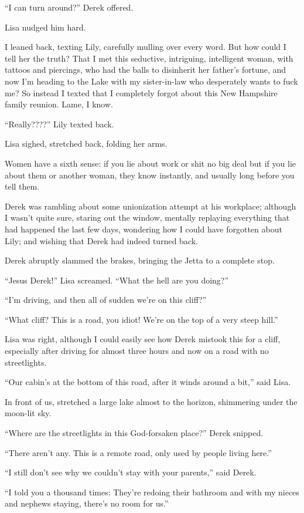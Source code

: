 ``I can turn around?'' Derek offered.

Lisa nudged him hard.

I leaned back, texting Lily, carefully mulling over every word. But how
could I tell her the truth? That I met this seductive, intriguing,
intelligent woman, with tattoos and piercings, who had the balls to
disinherit her father's fortune, and now I'm heading to the Lake with my
sister-in-law who desperately wants to fuck me? So instead I texted that
I completely forgot about this New Hampshire family reunion. Lame, I
know.

``Really????'' Lily texted back.

Lisa sighed, stretched back, folding her arms.

Women have a sixth sense: if you lie about work or shit no big deal but
if you lie about them or another woman, they know instantly, and usually
long before you tell them.

Derek was rambling about some unionization attempt at his workplace;
although I wasn't quite sure, staring out the window, mentally replaying
everything that had happened the last few days, wondering how I could
have forgotten about Lily; and wishing that Derek had indeed turned
back.

Derek abruptly slammed the brakes, bringing the Jetta to a complete
stop.

``Jesus Derek!'' Lisa screamed. ``What the hell are you doing?''

``I'm driving, and then all of sudden we're on this cliff?''

``What cliff? This is a road, you idiot! We're on the top of a very
steep hill.''

Lisa was right, although I could easily see how Derek mistook this for a
cliff, especially after driving for almost three hours and now on a road
with no streetlights.

``Our cabin's at the bottom of this road, after it winds around a bit,''
said Lisa.

In front of us, stretched a large lake almost to the horizon, shimmering
under the moon-lit sky.

``Where are the streetlights in this God-forsaken place?'' Derek
snipped.

``There aren't any. This is a remote road, only used by people living
here.''

``I still don't see why we couldn't stay with your parents,'' said
Derek.

``I told you a thousand times: They're redoing their bathroom and with
my nieces and nephews staying, there's no room for us.''

